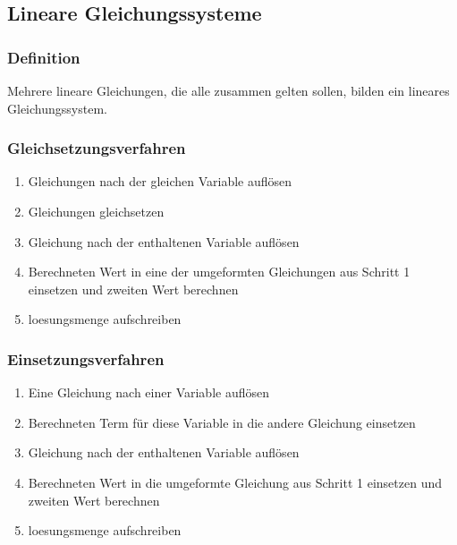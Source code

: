 \begin{multicols}{2}
    \subsection{Lineare Gleichungssysteme}
    \vspace{-4mm}
    \subsubsection{Definition}
    \vspace{-4mm}
    Mehrere lineare Gleichungen, die alle zusammen gelten sollen, bilden ein lineares Gleichungssystem.\\
    \subsubsection{Gleichsetzungsverfahren}
    \vspace{-4mm}
    \begin{enumerate}
        \item Gleichungen nach der gleichen Variable auflösen
        \item Gleichungen gleichsetzen
        \item Gleichung nach der enthaltenen Variable auflösen
        \item Berechneten Wert in eine der umgeformten Gleichungen aus Schritt 1 einsetzen und zweiten Wert berechnen
        \item loesungsmenge aufschreiben
    \end{enumerate}

    \subsubsection{Einsetzungsverfahren}
    \vspace{-4mm}
    \begin{enumerate}
        \item     Eine Gleichung nach einer Variable auflösen
        \item     Berechneten Term für diese Variable in die andere Gleichung einsetzen
        \item     Gleichung nach der enthaltenen Variable auflösen
        \item     Berechneten Wert in die umgeformte Gleichung aus Schritt 1 einsetzen und zweiten Wert berechnen
        \item     loesungsmenge aufschreiben
    \end{enumerate}


\end{multicols}
